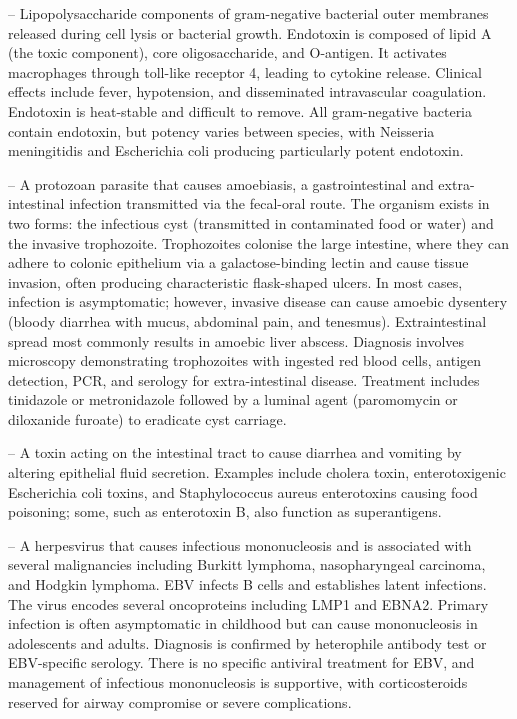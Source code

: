 -- Lipopolysaccharide components of gram-negative bacterial outer membranes released during cell lysis or bacterial growth. Endotoxin is composed of lipid A (the toxic component), core oligosaccharide, and O-antigen. It activates macrophages through toll-like receptor 4, leading to cytokine release. Clinical effects include fever, hypotension, and disseminated intravascular coagulation. Endotoxin is heat-stable and difficult to remove. All gram-negative bacteria contain endotoxin, but potency varies between species, with Neisseria meningitidis and Escherichia coli producing particularly potent endotoxin.

-- A protozoan parasite that causes amoebiasis, a gastrointestinal and extra-intestinal infection transmitted via the fecal-oral route. The organism exists in two forms: the infectious cyst (transmitted in contaminated food or water) and the invasive trophozoite. Trophozoites colonise the large intestine, where they can adhere to colonic epithelium via a galactose-binding lectin and cause tissue invasion, often producing characteristic flask-shaped ulcers. In most cases, infection is asymptomatic; however, invasive disease can cause amoebic dysentery (bloody diarrhea with mucus, abdominal pain, and tenesmus). Extraintestinal spread most commonly results in amoebic liver abscess. Diagnosis involves microscopy demonstrating trophozoites with ingested red blood cells, antigen detection, PCR, and serology for extra-intestinal disease. Treatment includes tinidazole or metronidazole followed by a luminal agent (paromomycin or diloxanide furoate) to eradicate cyst carriage.

-- A toxin acting on the intestinal tract to cause diarrhea and vomiting by altering epithelial fluid secretion. Examples include cholera toxin, enterotoxigenic Escherichia coli toxins, and Staphylococcus aureus enterotoxins causing food poisoning; some, such as enterotoxin B, also function as superantigens.

-- A herpesvirus that causes infectious mononucleosis and is associated with several malignancies including Burkitt lymphoma, nasopharyngeal carcinoma, and Hodgkin lymphoma. EBV infects B cells and establishes latent infections. The virus encodes several oncoproteins including LMP1 and EBNA2. Primary infection is often asymptomatic in childhood but can cause mononucleosis in adolescents and adults. Diagnosis is confirmed by heterophile antibody test or EBV-specific serology. There is no specific antiviral treatment for EBV, and management of infectious mononucleosis is supportive, with corticosteroids reserved for airway compromise or severe complications.

